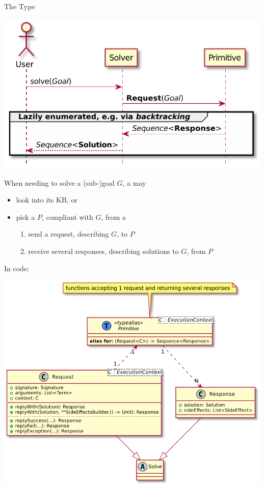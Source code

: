 \documentclass[handout]{beamer}
\begin{document}
\begin{frame}[allowframebreaks]{The  Type}
    \smallskip

    \begin{center}
        \includegraphics[width=.5\linewidth]{img/primitive-usage.pdf}
    \end{center}

    \framebreak
    
    When needing to solve a (sub-)goal $G$, a  may
    \begin{itemize}
        \item look into its KB, or
        \item pick a  $P$, compliant with $G$, from a 
        \begin{enumerate}
            \item send a \alert{request}, describing $G$, to $P$
            \item receive several \alert{responses}, describing solutions to $G$, from $P$
        \end{enumerate}
    \end{itemize}

    \framebreak

    In code:
    \begin{center}
        \includegraphics[width=.5\linewidth]{img/primitive.pdf}
    \end{center}

    \framebreak




\end{frame}
\end{document}
